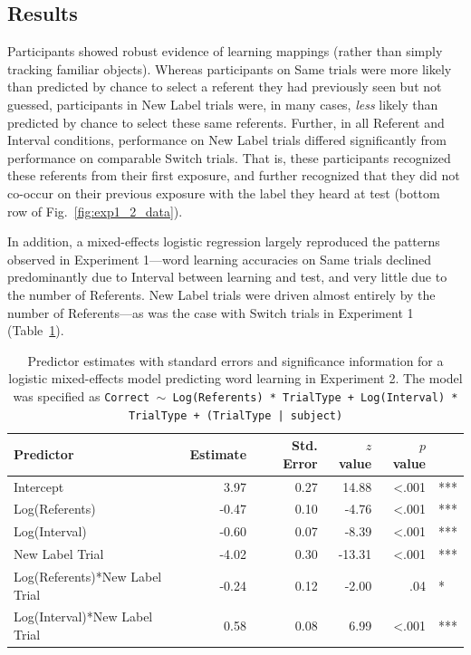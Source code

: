\documentclass[man,floatsintext]{apa6}
\begin{document}
\subsection{Results}

Participants showed robust evidence of learning mappings (rather than simply tracking familiar objects). Whereas participants on Same trials were more likely than predicted by chance to select a referent they had previously seen but not guessed, participants in New Label trials were, in many cases, \emph{less} likely than predicted by chance to select these same referents. Further, in all Referent and Interval conditions, performance on New Label trials differed significantly from performance on comparable Switch trials. That is, these participants recognized these referents from their first exposure, and further recognized that they did not co-occur on their previous exposure with the label they heard at test (bottom row of Fig.~\ref{fig:exp1_2_data}).

In addition, a mixed-effects logistic regression largely reproduced the patterns observed in Experiment 1---word learning accuracies on Same trials declined predominantly due to Interval between learning and test, and very little due to the number of Referents. New Label trials were driven almost entirely by the number of Referents---as was the case with Switch trials in Experiment 1 (Table~\ref{tab:exp2_reg}).

\begin{table}[ht]
\begin{center}
\begin{tabular}{lrrrrl}
 Predictor & Estimate & Std. Error & $z$ value & $p$ value &  \\ 
  \hline
Intercept & 3.97 & 0.27 & 14.88 & <.001 & *** \\ 
  Log(Referents) & -0.47 & 0.10 & -4.76 & <.001 & *** \\ 
  Log(Interval) & -0.60 & 0.07 & -8.39 & <.001 & *** \\ 
  New Label Trial & -4.02 & 0.30 & -13.31 & <.001 & *** \\ 
  Log(Referents)*New Label Trial & -0.24 & 0.12 & -2.00 & .04 & * \\ 
  Log(Interval)*New Label Trial & 0.58 & 0.08 & 6.99 & <.001 & *** \\ 
   \hline
\end{tabular}
\end{center}
\caption{\label{tab:exp2_reg}Predictor estimates with standard errors and significance information for a logistic mixed-effects model predicting word learning in Experiment 2. The model was specified as \small{\tt{Correct $\sim$ Log(Referents) * TrialType + Log(Interval) * TrialType + (TrialType | subject)}}}
\end{table}
\end{document}
